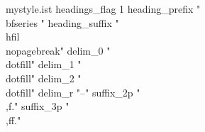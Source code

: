 \usepackage[original]{imakeidx}
\makeindex[title=Stichwortverzeichnis, options=-s mystyle]
\usepackage{filecontents}
\begin{filecontents}{mystyle.ist}
	headings_flag  1 %
	heading_prefix "{\\bfseries " %
	heading_suffix "\\hfil}\\nopagebreak\n"%
	delim_0 "\\dotfill" %
	delim_1 "\\dotfill" %
	delim_2 "\\dotfill" %
	delim_r "--" %
	suffix_2p "\\,f." %
	suffix_3p "\\,ff." %
\end{filecontents}

\usepackage[style=alphabetic, isbn=false, backend=bibtex]{biblatex}

%

\usepackage[hidelinks, breaklinks=true]{hyperref}
